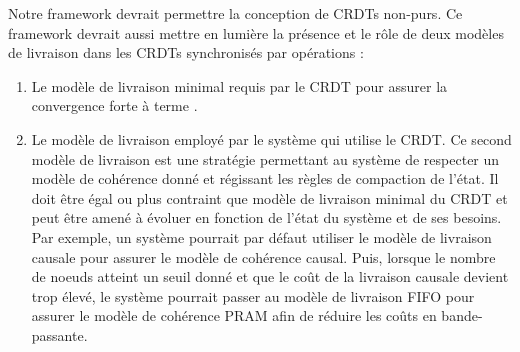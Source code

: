 Notre framework devrait permettre la conception de \acp{CRDT} non-purs.
Ce framework devrait aussi mettre en lumière la présence et le rôle de deux modèles de livraison dans les \acp{CRDT} synchronisés par opérations :
\begin{enumerate}
    \item Le modèle de livraison minimal requis par le \ac{CRDT} pour assurer la convergence forte à terme \cite{shapiro_2011_crdt}.
    \item Le modèle de livraison employé par le système qui utilise le \ac{CRDT}.
        Ce second modèle de livraison est une stratégie permettant au système de respecter un modèle de cohérence donné et régissant les règles de compaction de l'état.
        Il doit être égal ou plus contraint que modèle de livraison minimal du \ac{CRDT} et peut être amené à évoluer en fonction de l'état du système et de ses besoins.
        Par exemple, un système pourrait par défaut utiliser le modèle de livraison causale pour assurer le modèle de cohérence causal.
        Puis, lorsque le nombre de noeuds atteint un seuil donné et que le coût de la livraison causale devient trop élevé, le système pourrait passer au modèle de livraison FIFO pour assurer le modèle de cohérence PRAM afin de réduire les coûts en bande-passante.
\end{enumerate}
